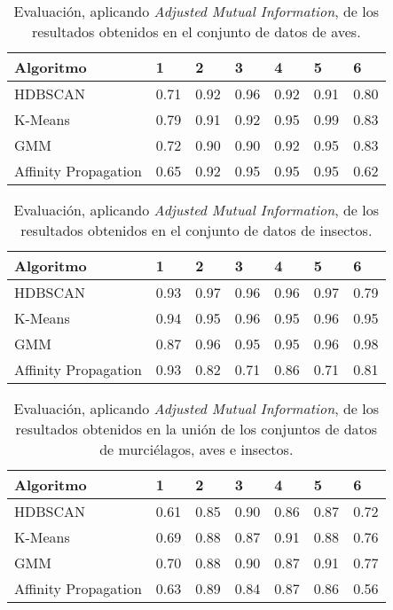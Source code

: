\begin{table}[H]
    \centering
    \begin{tabular}{lllllll}
        \hline
        Algoritmo & 1 & 2 & 3 & 4 & 5 & 6  \\ \hline
        HDBSCAN & 0.71 & 0.92 & 0.96 & 0.92 & 0.91 & 0.80 \\
        K-Means & 0.79 & 0.91 & 0.92 & 0.95 & \cellcolor[HTML]{FFFC9E}0.99 & 0.83 \\
        GMM & 0.72 & 0.90 & 0.90 & 0.92 & 0.95 & 0.83 \\
        Affinity Propagation & 0.65 & 0.92 & 0.95 & 0.95 & 0.95 & 0.62 \\
    \end{tabular}
    \caption{Evaluación, aplicando \textit{Adjusted Mutual Information}, de los resultados obtenidos en el conjunto de datos de aves.}
    \label{table:birds-ami}
\end{table}

\begin{table}[H]
    \centering
    \begin{tabular}{lllllll}
        \hline
        Algoritmo & 1 & 2 & 3 & 4 & 5 & 6  \\ \hline
        HDBSCAN & 0.93 & 0.97 & 0.96 & 0.96 & 0.97 & 0.79 \\
        K-Means & 0.94 & 0.95 & 0.96 & 0.95 & 0.96 & 0.95 \\
        GMM & 0.87 & 0.96 & 0.95 & 0.95 & 0.96 & \cellcolor[HTML]{FFFC9E}0.98 \\
        Affinity Propagation & 0.93 & 0.82 & 0.71 & 0.86 & 0.71 & 0.81 \\
    \end{tabular}
    \caption{Evaluación, aplicando \textit{Adjusted Mutual Information}, de los resultados obtenidos en el conjunto de datos de insectos.}
    \label{table:insects-ami}
\end{table}

\begin{table}[H]
    \centering
    \begin{tabular}{lllllll}
        \hline
        Algoritmo & 1 & 2 & 3 & 4 & 5 & 6  \\ \hline
        HDBSCAN & 0.61 & 0.85 & 0.90 & 0.86 & 0.87 & 0.72 \\
        K-Means & 0.69 & 0.88 & 0.87 & \cellcolor[HTML]{FFFC9E}0.91 & 0.88 & 0.76 \\
        GMM & 0.70 & 0.88 & 0.90 & 0.87 & \cellcolor[HTML]{FFFC9E}0.91 & 0.77 \\
        Affinity Propagation & 0.63 & 0.89 & 0.84 & 0.87 & 0.86 & 0.56 \\
    \end{tabular}
    \caption{Evaluación, aplicando \textit{Adjusted Mutual Information}, de los resultados obtenidos en la unión de los conjuntos de datos de murciélagos, aves e insectos.}
    \label{table:all-ami}
\end{table}

